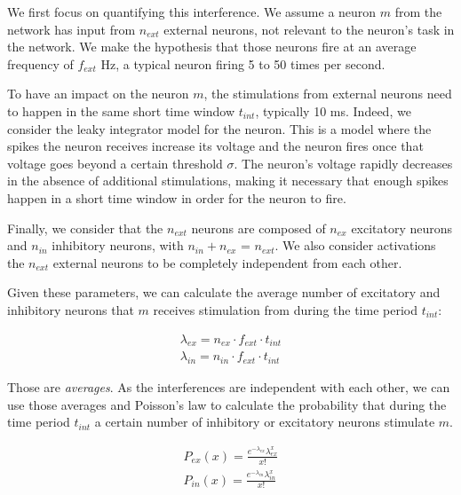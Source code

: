 \documentclass[journal]{IEEEtran}
\begin{document}
We first focus on quantifying this interference. We assume a neuron $m$ from the network has input from $n_{ext}$ external neurons, not relevant to the neuron's task in the network. We make the hypothesis that those neurons fire at an average frequency of $f_{ext}$ Hz, a typical neuron firing 5 to 50 times per second. 

To have an impact on the neuron $m$, the stimulations from external neurons need to happen in the same short time window $t_{int}$, typically 10 ms. Indeed, we consider the leaky integrator model\cite{jaeger2007optimization} for the neuron. This is a model where the spikes the neuron receives increase its voltage and the neuron fires once that voltage goes beyond a certain threshold $\sigma$. The neuron's voltage rapidly decreases in the absence of additional stimulations, making it necessary that enough spikes happen in a short time window in order for the neuron to fire.

Finally, we consider that the $n_{ext}$ neurons are composed of $n_{ex}$ excitatory neurons and $n_{in}$ inhibitory neurons, with $n_{in} + n_{ex}$ = $n_{ext}$. We also consider activations the $n_{ext}$ external neurons to be completely independent from each other.

Given these parameters, we can calculate the average number of excitatory and inhibitory neurons that $m$ receives stimulation from during the time period $t_{int}$:

\begin{align}
\lambda_{ex} = n_{ex}\cdot f_{ext} \cdot t_{int}\\
\lambda_{in} = n_{in}\cdot f_{ext} \cdot t_{int}
\end{align}

Those are \emph{averages}. As the interferences are independent with each other, we can use those averages and Poisson's law to calculate the probability that during the time period $t_{int}$ a certain number of inhibitory or excitatory neurons stimulate $m$.

\begin{align}
P_{ex}\left( x \right) = \frac{{e^{ - \lambda_{ex} } \lambda_{ex} ^x }}{{x!}}\\
P_{in}\left( x \right) = \frac{{e^{ - \lambda_{in} } \lambda_{in} ^x }}{{x!}}
\end{align} 
\end{document}
